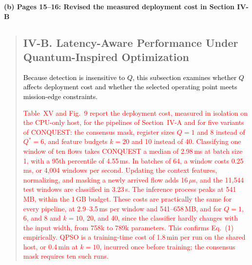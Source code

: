 \documentclass[11pt]{article}
\newenvironment{excerpt}{\begin{quote}\sloppy}{\end{quote}}
\newcommand{\mshead}[2]{\subsection*{\textbf{#1. #2}}}
\newcommand{\loc}[1]{\par\medskip\noindent\textbf{#1}\par}
\begin{document}
\loc{(b) Pages 15--16: Revised the measured deployment cost in Section IV-B}
\begin{excerpt}
\mshead{IV-B}{Latency-Aware Performance Under Quantum-Inspired Optimization}


\textcolor{black}{Because detection is insensitive to $Q$,
this subsection examines whether $Q$ affects deployment cost and
whether the selected operating point meets mission-edge
constraints.}

\textcolor{red}{Table~XV
and Fig.~9 report the deployment cost, measured in
isolation on the CPU-only host, for the pipelines of
Section~IV-A and for five variants of
CONQUEST: the consensus mask, register sizes $Q=1$ and 8 instead of
$Q^{*}=6$, and feature budgets $k=20$ and 10 instead of 40. Classifying one window of ten flows
takes CONQUEST a median of 2.98\,ms at batch size 1, with a 95th
percentile of 4.55\,ms. In batches of 64, a window costs 0.25\,ms, or
4{,}004 windows per second. Updating the context features,
normalizing, and masking a newly arrived flow adds 16\,$\mu$s, and the
11{,}544 test windows are classified in 3.23\,s. The inference process
peaks at 541\,MB, within the 1\,GB budget. These costs are practically
the same for every pipeline, at 2.9--3.5\,ms per window and
541--658\,MB, and for $Q=1$, 6, and 8 and $k=10$, 20, and 40, since
the classifier hardly changes with the input width, from 758k to 789k
parameters. This confirms Eq.~(1) empirically. QPSO is a
training-time cost of 1.8\,min per run on the shared host, or
0.4\,min at $k=10$, incurred once before training; the consensus mask
requires ten such runs.}
\end{excerpt}
\setcounter{table}{14}
\end{document}
